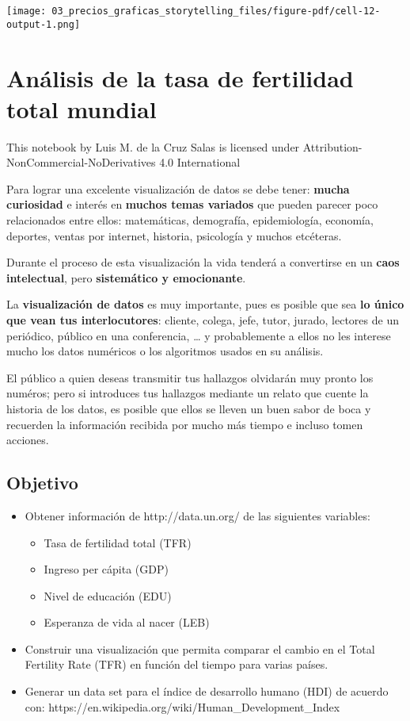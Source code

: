 \documentclass[
  letterpaper,
  DIV=11,
  numbers=noendperiod]{scrreprt}
\providecommand{\tightlist}{%
  \setlength{\itemsep}{0pt}\setlength{\parskip}{0pt}}\usepackage{longtable,booktabs,array}
\begin{document}
\texttt{[image: 03\_precios\_graficas\_storytelling\_files/figure-pdf/cell-12-output-1.png]}


\chapter{Análisis de la tasa de fertilidad total
mundial}\label{anuxe1lisis-de-la-tasa-de-fertilidad-total-mundial}

This notebook by Luis M. de la Cruz Salas is licensed under
Attribution-NonCommercial-NoDerivatives 4.0 International

Para lograr una excelente visualización de datos se debe tener:
\textbf{mucha curiosidad} e interés en \textbf{muchos temas variados}
que pueden parecer poco relacionados entre ellos: matemáticas,
demografía, epidemiología, economía, deportes, ventas por internet,
historia, psicología y muchos etcéteras.

Durante el proceso de esta visualización la vida tenderá a convertirse
en un \textbf{caos intelectual}, pero \textbf{sistemático y
emocionante}.

La \textbf{visualización de datos} es muy importante, pues es posible
que sea \textbf{lo único que vean tus interlocutores}: cliente, colega,
jefe, tutor, jurado, lectores de un periódico, público en una
conferencia, \ldots{} y probablemente a ellos no les interese mucho los
datos numéricos o los algoritmos usados en su análisis.

El público a quien deseas transmitir tus hallazgos olvidarán muy pronto
los numéros; pero si introduces tus hallazgos mediante un relato que
cuente la historia de los datos, es posible que ellos se lleven un buen
sabor de boca y recuerden la información recibida por mucho más tiempo e
incluso tomen acciones.

\section{Objetivo}\label{objetivo}

\begin{itemize}
\item
  Obtener información de http://data.un.org/ de las siguientes
  variables:

  \begin{itemize}
  \tightlist
  \item
    Tasa de fertilidad total (TFR)
  \item
    Ingreso per cápita (GDP)
  \item
    Nivel de educación (EDU)
  \item
    Esperanza de vida al nacer (LEB)
  \end{itemize}
\item
  Construir una visualización que permita comparar el cambio en el Total
  Fertility Rate (TFR) en función del tiempo para varias países.
\item
  Generar un data set para el índice de desarrollo humano (HDI) de
  acuerdo con: https://en.wikipedia.org/wiki/Human\_Development\_Index
\end{itemize}
\end{document}

